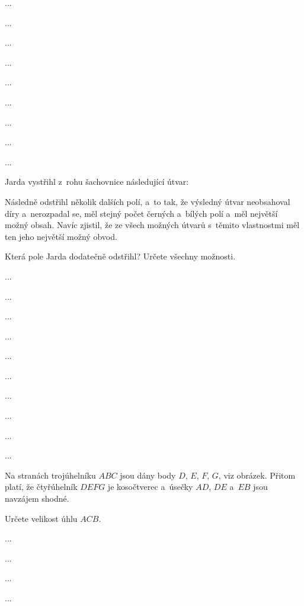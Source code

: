 ﻿{%
...}

{%
...}

{%
...}

{%
...}

{%
...}

{%
...}

{%
...}

{%
...}

{%
...}

{%
Jarda vystřihl z~rohu šachovnice následující útvar:
%

Následně odstřihl několik dalších polí, a~to tak, že výsledný útvar
neobsahoval díry a~nerozpadal se,
měl stejný počet černých a~bílých polí
a~měl největší možný obsah.
Navíc zjistil, že ze všech možných útvarů s~těmito vlastnostmi měl ten jeho největší možný obvod.

Která pole Jarda dodatečně odstřihl?
Určete všechny možnosti.
}

{%
...}

{%
...}

{%
...}

{%
...}

{%
...}

{%
...}

{%
...}

{%
...}

{%
...}

{%
...}

{%
Na stranách trojúhelníku $ABC$ jsou dány body $D$, $E$, $F$, $G$, viz obrázek.
Přitom platí, že čtyřúhelník $DEFG$ je kosočtverec a~úsečky $AD$, $DE$ a~$EB$ jsou navzájem shodné.

Určete velikost úhlu $ACB$.
%
}

{%
...}

{%
...}

{%
...}

{%
...}

